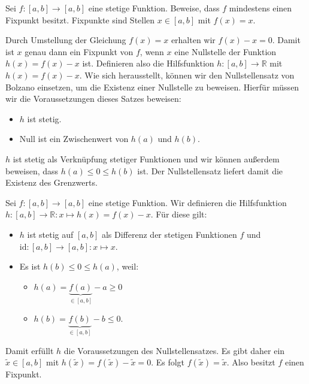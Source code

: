 \documentclass[fontsize=9pt,
               parskip=half-,
               DIV=14,
               listof=chapterentry,
               tocflat]{scrbook}
\begin{document}
\begin{exercise*}[Fixpunktsatz]
Sei $f:[a,b]\to [a,b]$ eine stetige Funktion. Beweise, dass $f$ mindestens einen Fixpunkt besitzt. Fixpunkte sind Stellen $x\in [a,b]$ mit $f(x)=x$.

\end{exercise*}

\begin{solutionprocess*}[Fixpunktsatz]
Durch Umstellung der Gleichung $f(x)=x$ erhalten wir $f(x)-x=0$. Damit ist $x$ genau dann ein Fixpunkt von $f$, wenn $x$ eine Nullstelle der Funktion $h(x)=f(x)-x$ ist. Definieren also die Hilfsfunktion $h:[a,b]\to \mathbb {R} $ mit $h(x)=f(x)-x$. Wie sich herausstellt, können wir den Nullstellensatz von Bolzano einsetzen, um die Existenz einer Nullstelle zu beweisen. Hierfür müssen wir die Voraussetzungen dieses Satzes beweisen:

\begin{itemize}
\item $h$ ist stetig.
\item Null ist ein Zwischenwert von $h(a)$ und $h(b)$.
\end{itemize}

$h$ ist stetig als Verknüpfung stetiger Funktionen und wir können außerdem beweisen, dass $h(a)\leq 0\leq h(b)$ ist. Der Nullstellensatz liefert damit die Existenz des Grenzwerts.

\end{solutionprocess*}

\begin{proof*}[Fixpunktsatz]
Sei $f:[a,b]\to [a,b]$ eine stetige Funktion. Wir definieren die Hilfsfunktion $h:[a,b]\to \mathbb {R} :x\mapsto h(x)=f(x)-x$. Für diese gilt:

\begin{itemize}
\item $h$ ist stetig auf $[a,b]$ als Differenz der stetigen Funktionen $f$ und ${\text{id}}:[a,b]\to [a,b]:x\mapsto x$.
\item Es ist $h(b)\leq 0\leq h(a)$, weil: \begin{itemize}
\item $h(a)=\underbrace {f(a)} _{\in [a,b]}-a\geq 0$
\item $h(b)=\underbrace {f(b)} _{\in [a,b]}-b\leq 0$.
\end{itemize}


\end{itemize}

Damit erfüllt $h$ die Voraussetzungen des Nullstellensatzes. Es gibt daher ein ${\tilde {x}}\in [a,b]$ mit $h({\tilde {x}})=f({\tilde {x}})-{\tilde {x}}=0$. Es folgt $f({\tilde {x}})={\tilde {x}}$. Also besitzt $f$ einen Fixpunkt.

\end{proof*}
\end{document}
